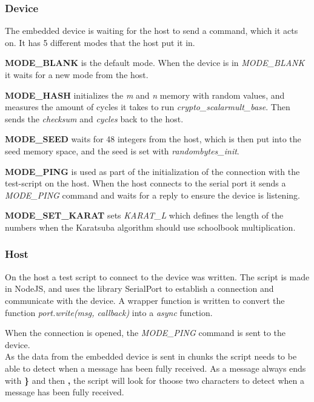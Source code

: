 \subsubsection{Device}
The embedded device is waiting for the host to send a command, which it acts on. It has 5 different modes that the host put it in.

\medskip
\textbf{MODE\_BLANK} is the default mode. When the device is in \textit{MODE\_BLANK} it waits for a new mode from the host.

\medskip
\textbf{MODE\_HASH} initializes the \textit{m} and \textit{n} memory with random values, and measures the amount of cycles it takes to run \textit{crypto\_scalarmult\_base}. Then sends the \textit{checksum} and \textit{cycles} back to the host.

\medskip
\textbf{MODE\_SEED} waits for 48 integers from the host, which is then put into the seed memory space, and the seed is set with \textit{randombytes\_init}.

\medskip
\textbf{MODE\_PING} is used as part of the initialization of the connection with the test-script on the host. When the host connects to the serial port it sends a \textit{MODE\_PING} command and waits for a reply to ensure the device is listening.

\medskip
\textbf{MODE\_SET\_KARAT} sets \textit{KARAT\_L} which defines the length of the numbers when the Karatsuba algorithm should use schoolbook multiplication.

\medskip
\subsubsection{Host}
On the host a test script to connect to the device was written. The script is made in NodeJS\cite{nodejs}, and uses the library SerialPort\cite{serialport} to establish a connection and communicate with the device.
A wrapper function is written to convert the function \textit{port.write(msg, callback)} into a \textit{async} function. 

\medskip
When the connection is opened, the \textit{MODE\_PING} command is sent to the device.
\\
As the data from the embedded device is sent in chunks the script needs to be able to detect when a message has been fully received. As a message always ends with \textbf{\}} and then \textbf{,} the script will look for thoose two characters to detect when a message has been fully received.

